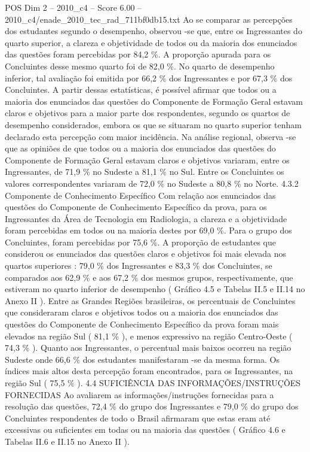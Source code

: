 \begin{textsample}{POS Dim 2 – 2010\_c4 – Score 6.00 – 2010\_c4/enade\_2010\_tec\_rad\_711bf0db15.txt}
Ao se comparar as percepções dos estudantes segundo o desempenho, observou -se que, entre os Ingressantes do quarto superior, a clareza e objetividade de todos ou da maioria dos enunciados das questões foram percebidas por 84,2 \%.
A proporção apurada para os Concluintes desse mesmo quarto foi de 82,0 \%.
No quarto de desempenho inferior, tal avaliação foi emitida por 66,2 \% dos Ingressantes e por 67,3 \% dos Concluintes.
A partir dessas estatísticas, é possível afirmar que todos ou a maioria dos enunciados das questões do Componente de Formação Geral estavam claros e objetivos para a maior parte dos respondentes, segundo os quartos de desempenho considerados, embora os que se situaram no quarto superior tenham declarado esta percepção com maior incidência.
Na análise regional, observa -se que as opiniões de que todos ou a maioria dos enunciados das questões do Componente de Formação Geral estavam claros e objetivos variaram, entre os Ingressantes, de 71,9 \% no Sudeste a 81,1 \% no Sul.
Entre os Concluintes os valores correspondentes variaram de 72,0 \% no Sudeste a 80,8 \% no Norte. 4.3.2 Componente de Conhecimento Específico Com relação aos enunciados das questões do Componente de Conhecimento Específico da prova, para os Ingressantes da Área de Tecnologia em Radiologia, a clareza e a objetividade foram percebidas em todos ou na maioria destes por 69,0 \%.
Para o grupo dos Concluintes, foram percebidas por 75,6 \%.
A proporção de estudantes que considerou os enunciados das questões claros e objetivos foi mais elevada nos quartos superiores : 79,0 \% dos Ingressantes e 83,3 \% dos Concluintes, se comparados aos 62,9 \% e aos 67,2 \% dos mesmos grupos, respectivamente, que estiveram no quarto inferior de desempenho ( Gráfico 4.5 e Tabelas II.5 e II.14 no Anexo II ).
Entre as Grandes Regiões brasileiras, os percentuais de Concluintes que consideraram claros e objetivos todos ou a maioria dos enunciados das questões do Componente de Conhecimento Específico da prova foram mais elevados na região Sul ( 81,1 \% ), e menos expressivo na região Centro-Oeste ( 74,3 \% ).
Quanto aos Ingressantes, o percentual mais baixos ocorreu na região Sudeste onde 66,6 \% dos estudantes manifestaram -se da mesma forma.
Os índices mais altos desta percepção foram encontrados, para os Ingressantes, na região Sul ( 75,5 \% ). 4.4 SUFICIÊNCIA DAS INFORMAÇÕES/INSTRUÇÕES FORNECIDAS Ao avaliarem as informações/instruções fornecidas para a resolução das questões, 72,4 \% do grupo dos Ingressantes e 79,0 \% do grupo dos Concluintes respondentes de todo o Brasil afirmaram que estas eram até excessivas ou suficientes em todas ou na maioria das questões ( Gráfico 4.6 e Tabelas II.6 e II.15 no Anexo II ).

\end{textsample}
